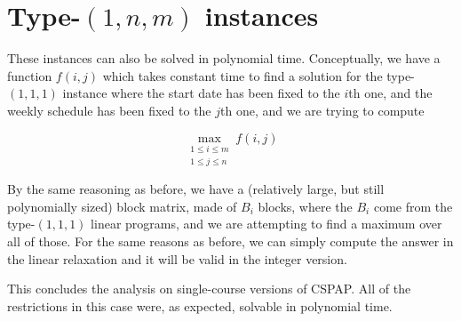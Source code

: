 \section{Type-$(1, n, m)$ instances}

These instances can also be solved in polynomial time. Conceptually, we have a function $f(i, j)$ which takes constant time to find a solution for the type-$(1, 1, 1)$ instance where the start date has been fixed to the $i$th one, and the weekly schedule has been fixed to the $j$th one, and we are trying to compute

$$
\max_{\substack{1 \le i \le m\\1 \le j \le n}} f(i, j)
$$

By the same reasoning as before, we have a (relatively large, but still polynomially sized) block matrix, made of $B_i$ blocks, where the $B_i$ come from the type-$(1, 1, 1)$ linear programs, and we are attempting to find a maximum over all of those. For the same reasons as before, we can simply compute the answer in the linear relaxation and it will be valid in the integer version.

This concludes the analysis on single-course versions of CSPAP. All of the restrictions in this case were, as expected, solvable in polynomial time.
